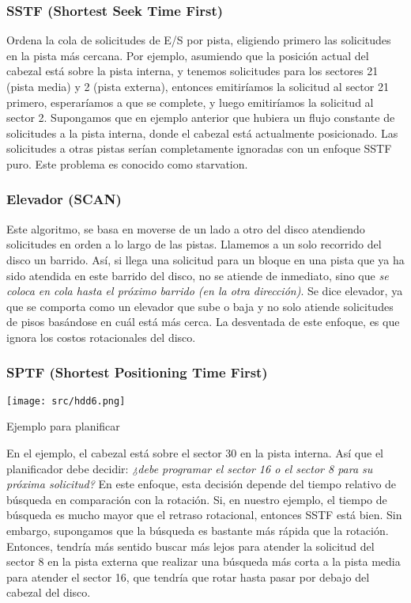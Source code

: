 \documentclass[openany]{book}
\begin{document}
\subsubsection{SSTF (Shortest Seek Time First)}
Ordena la cola de solicitudes de E/S por pista, \colorbox{yellow!20}{eligiendo primero} las solicitudes en la \colorbox{yellow!20}{pista más cercana}. Por ejemplo, asumiendo que la posición actual del cabezal está sobre la pista interna, y tenemos solicitudes para los sectores 21 (pista media) y 2 (pista externa), entonces emitiríamos la solicitud al sector 21 primero, esperaríamos a que se complete, y luego emitiríamos la solicitud al sector 2. Supongamos que en ejemplo anterior que hubiera un flujo constante de solicitudes a la pista interna, donde el cabezal está actualmente posicionado. Las solicitudes a otras pistas serían \colorbox{yellow!20}{completamente ignoradas} con un enfoque SSTF puro. Este problema es conocido como \colorbox{yellow!20}{starvation}.

\subsubsection{Elevador (SCAN)}
Este algoritmo, se basa en \colorbox{yellow!20}{moverse de un lado a otro} del disco atendiendo solicitudes en orden a lo largo de las pistas. Llamemos a un solo recorrido del disco \colorbox{yellow!20}{un barrido}. Así, si llega una solicitud para un bloque en una pista que ya ha sido atendida en este barrido del disco, no se atiende de inmediato, sino que \textit{se coloca en cola hasta el próximo barrido (en la otra dirección)}. Se dice elevador, ya que se comporta como un elevador que sube o baja y no solo atiende solicitudes de pisos basándose en cuál está más cerca. La desventada de este enfoque, es que \colorbox{yellow!20}{ignora los costos rotacionales del disco}.

\subsubsection{SPTF (Shortest Positioning Time First)}

\begin{floatingfigure}[r]{0.3\textwidth}
    \texttt{[image: src/hdd6.png]}
    \caption{Ejemplo para planificar}
\end{floatingfigure}

En el ejemplo, el cabezal está sobre el sector 30 en la pista interna. Así que el planificador debe decidir: \textit{¿debe programar el sector 16 o el sector 8 para su próxima solicitud?} En este enfoque, esta decisión depende del \colorbox{yellow!20}{tiempo relativo de búsqueda} en comparación con la rotación. Si, en nuestro ejemplo, el tiempo de búsqueda es mucho mayor que el retraso rotacional, entonces SSTF está bien. Sin embargo, supongamos que la búsqueda es bastante más rápida que la rotación. Entonces, tendría más sentido buscar más lejos para atender la solicitud del sector 8 en la pista externa que realizar una búsqueda más corta a la pista media para atender el sector 16, que tendría que rotar hasta pasar por debajo del cabezal del disco.
\end{document}

